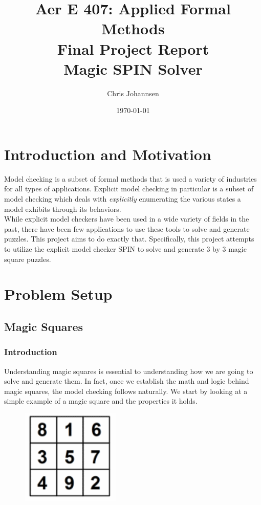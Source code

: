 \documentclass[a4paper]{article}
\title{Aer E 407: Applied Formal Methods \\ Final Project Report \\ Magic SPIN Solver}
\author{Chris Johannsen}
\date{\today}
\begin{document}
\maketitle

\section{Introduction and Motivation}
\label{sec:introduction}

Model checking is a subset of formal methods that is used a variety of industries for all types of applications. Explicit model checking in particular is a subset of model checking which deals with {\it explicitly} enumerating the various states a model exhibits through its behaviors.\\

While explicit model checkers have been used in a wide variety of fields in the past, there have been few applications to use these tools to solve and generate puzzles. This project aims to do exactly that. Specifically, this project attempts to utilize the explicit model checker SPIN to solve and generate 3 by 3 magic square puzzles. \\

\section{Problem Setup}
\label{sec:theory}

\subsection{Magic Squares}

\subsubsection{Introduction}

Understanding magic squares is essential to understanding how we are going to solve and generate them. In fact, once we establish the math and logic behind magic squares, the model checking follows naturally. We start by looking at a simple example of a magic square and the properties it holds. 

\begin{figure} [h]
\includegraphics{solution_1}
\centering
\end{figure}
\end{document}
